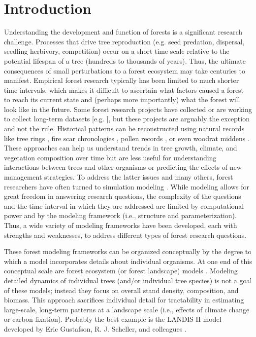 \documentclass[
11pt, %
a4paper, %
oneside, %
headinclude,footinclude, %
]{scrartcl}
\begin{document}


\doublespacing

\section{Introduction}

Understanding the development and function of forests is a significant research challenge. Processes that drive tree reproduction (e.g. seed predation, dispersal, seedling herbivory, competition) occur on a short time scale relative to the potential lifespan of a tree (hundreds to thousands of years). Thus, the ultimate consequences of small perturbations to a forest ecosystem may take centuries to manifest. Empirical forest research typically has been limited to much shorter time intervals, which makes it difficult to ascertain what factors caused a forest to reach its current state and (perhaps more importantly) what the forest will look like in the future. Some forest research projects have collected or are working to collect long-term datasets [e.g. \citealp{Swank1988, Franklin1990, Bierregaard1992, Sheriff2002, Kalb2013}], but these projects are arguably the exception and not the rule. Historical patterns can be reconstructed using natural records like tree rings \citep{Speer2010}, fire scar chronologies \citep{Arno1977, Guyette2006}, pollen records \citep{Pitkanen1999}, or even woodrat middens \citep{Betancourt1990}. These approaches can help us understand trends in tree growth, climate, and vegetation composition over time but are less useful for understanding interactions between trees and other organisms or predicting the effects of new management strategies. To address the latter issues and many others, forest researchers have often turned to simulation modeling \citep{Liu1995, Mladenoff1999, Bugmann2001}. While modeling allows for great freedom in answering research questions, the complexity of the questions and the time interval in which they are addressed are limited by computational power and by the modeling framework (i.e., structure and parameterization). Thus, a wide variety of modeling frameworks have been developed, each with strengths and weaknesses, to address different types of forest research questions.

These forest modeling frameworks can be organized conceptually by the degree to which a model incorporates details about individual organisms. At one end of this conceptual scale are forest ecosystem (or forest landscape) models \citep{Mladenoff1999}. Modeling detailed dynamics of individual trees (and/or individual tree species) is not a goal of these models; instead they focus on overall stand density, composition, and biomass. This approach sacrifices individual detail for tractability in estimating large-scale, long-term patterns at a landscape scale (i.e., effects of climate change or carbon fixation). Probably the best example is the LANDIS II model developed by Eric Gustafson, R. J. Scheller, and colleagues \citep{Mladenoff2004}.
\end{document}
